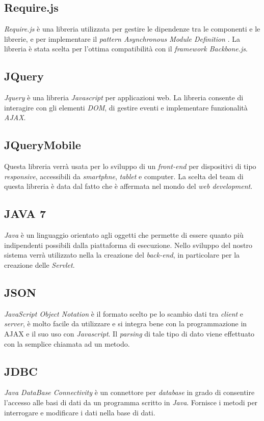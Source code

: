 \subsection{Require.js}
\textit{Require.js} è una libreria utilizzata per gestire le dipendenze tra le componenti e le librerie, e per implementare il \textit{pattern Asynchronous Module Definition
}. La libreria è stata scelta per l'ottima compatibilità con il \textit{framework Backbone.js}.
\subsection{JQuery}
\textit{Jquery} è una libreria \textit{Javascript} per applicazioni web.
La libreria consente di interagire con gli elementi \textit{DOM}, di gestire eventi e implementare funzionalità \textit{AJAX}.
\subsection{JQueryMobile}
Questa libreria verrà usata per lo sviluppo di un \textit{front-end} per dispositivi di tipo \textit{responsive}, accessibili da \textit{smartphne}, \textit{tablet} e computer. La scelta del team di questa libreria è data dal fatto che è affermata nel mondo del \textit{web development}.
\subsection{JAVA 7}
\textit{Java} è un linguaggio orientato agli oggetti che permette di essere quanto più indipendenti possibili dalla piattaforma di esecuzione. Nello sviluppo del nostro sistema verrà utilizzato nella la creazione del \textit{back-end}, in particolare per la creazione delle \textit{Servlet}.
\subsection{JSON}
\textit{JavaScript Object Notation} è il formato scelto pe lo scambio dati tra \textit{client} e \textit{server}, è molto facile da utilizzare e si integra bene con la programmazione in AJAX e il suo uso con \textit{Javascript}. Il \textit{parsing} di tale tipo di dato viene effettuato con la semplice chiamata ad un metodo.
\subsection{JDBC}
\textit{Java DataBase Connectivity} è un connettore per \textit{database} in grado di consentire l'accesso alle basi di dati da un programma scritto in \textit{Java}. Fornisce i metodi per interrogare e modificare i dati nella base di dati.

